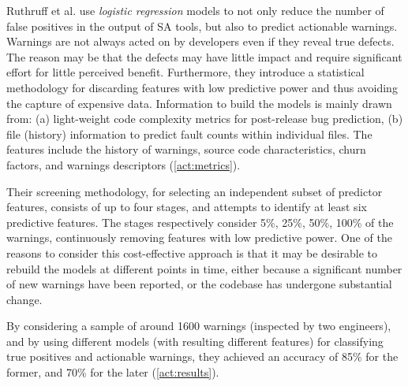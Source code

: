 \documentclass{article}
\begin{document}
 Ruthruff et al. \cite{actionable_sa} use \textit{logistic regression} models to not only reduce the number of false positives in the output of SA tools, but also to predict actionable warnings. Warnings are not always acted on by developers even if they reveal true defects. The reason may be that the defects may have little impact and require significant effort for little perceived benefit. Furthermore, they introduce a statistical methodology for discarding features with low predictive power and thus avoiding the capture of expensive data. Information to build the models is mainly drawn from: (a) light-weight code complexity metrics for post-release bug prediction, (b) file (history) information to predict fault counts within individual files. The features include the history of warnings, source code characteristics, churn factors, and warnings descriptors (\cref{act:metrics}).

 Their screening methodology, for selecting an independent subset of predictor features, consists of up to four stages, and attempts to identify at least six predictive features. The stages respectively consider 5\%, 25\%, 50\%, 100\% of the warnings, continuously removing features with low predictive power. One of the reasons to consider this cost-effective approach is that it may be desirable to rebuild the models at different points in time, either because a significant number of new warnings have been reported, or the codebase has undergone substantial change.

 By considering a sample of around 1600 warnings (inspected by two engineers), and by using different models (with resulting different features) for classifying true positives and actionable warnings, they achieved an accuracy of 85\% for the former, and 70\% for the later (\cref{act:results}).
\end{document}
